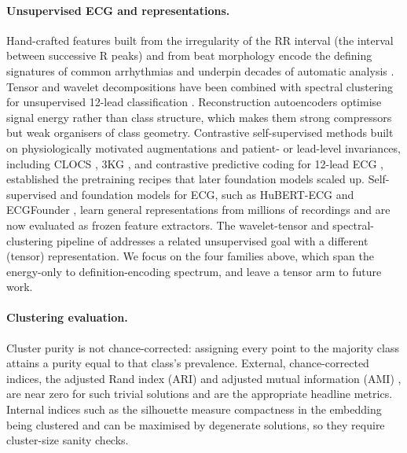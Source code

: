 \documentclass[preprint,11pt]{elsarticle}
\begin{document}
\paragraph{Unsupervised ECG and representations.} Hand-crafted features built from the
irregularity of the RR interval (the interval between successive R peaks) and from beat
morphology encode the defining signatures of common
arrhythmias and underpin decades of automatic analysis \cite{hrvstandards1996,dechazal2004}.
Tensor and wavelet decompositions have been combined with spectral clustering for
unsupervised 12-lead classification \cite{wavelettensorecg2018}. Reconstruction
autoencoders optimise signal energy rather than class structure, which makes them
strong compressors but weak organisers of class geometry. Contrastive self-supervised
methods built on physiologically motivated augmentations and patient- or lead-level
invariances, including CLOCS \cite{clocs2021}, 3KG \cite{threekg2021}, and contrastive
predictive coding for 12-lead ECG \cite{mehari2022ssl}, established the pretraining
recipes that later foundation models scaled up. Self-supervised and foundation models for
ECG, such as HuBERT-ECG \cite{hubertecg2024} and ECGFounder \cite{ecgfounder2024}, learn
general representations from millions of recordings and are now evaluated as frozen
feature extractors. The wavelet-tensor and spectral-clustering pipeline of
\cite{wavelettensorecg2018} addresses a related unsupervised goal with a different
(tensor) representation. We focus on the four families above, which span the energy-only
to definition-encoding spectrum, and leave a tensor arm to future work.

\paragraph{Clustering evaluation.} Cluster purity is not chance-corrected: assigning
every point to the majority class attains a purity equal to that class's prevalence.
External, chance-corrected indices, the adjusted Rand index (ARI) \cite{hubertarabie1985} and
adjusted mutual information (AMI) \cite{vinh2010}, are near zero for such trivial solutions
and are the appropriate headline metrics. Internal indices such as the silhouette
\cite{rousseeuw1987} measure compactness in the embedding being clustered and can be
maximised by degenerate solutions, so they require cluster-size sanity checks.
\end{document}

